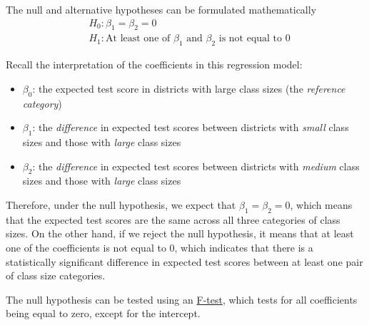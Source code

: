 \documentclass[
  12pt,
  a4paper,
]{scrbook}
\newenvironment{Shaded}{\begin{snugshade}}{\end{snugshade}}
\newcommand{\AttributeTok}[1]{\textcolor[rgb]{0.40,0.45,0.13}{#1}}
\newcommand{\DecValTok}[1]{\textcolor[rgb]{0.68,0.00,0.00}{#1}}
\newcommand{\FunctionTok}[1]{\textcolor[rgb]{0.28,0.35,0.67}{#1}}
\newcommand{\NormalTok}[1]{\textcolor[rgb]{0.00,0.23,0.31}{#1}}
\newcommand{\OtherTok}[1]{\textcolor[rgb]{0.00,0.23,0.31}{#1}}
\newcommand{\SpecialCharTok}[1]{\textcolor[rgb]{0.37,0.37,0.37}{#1}}
\newcommand{\StringTok}[1]{\textcolor[rgb]{0.13,0.47,0.30}{#1}}
\providecommand{\tightlist}{%
  \setlength{\itemsep}{0pt}\setlength{\parskip}{0pt}}
\renewcommand{\tightlist}{\setlength{\itemsep}{0.5\baselineskip}\setlength{\parskip}{0.2\baselineskip}}
\theoremstyle{plain}
\theoremstyle{definition}
\theoremstyle{remark}
\begin{document}
The null and alternative hypotheses can be formulated mathematically \[
\begin{split}
  &H_0: \beta_1 = \beta_2 = 0 \\
  &H_1: \text{At least one of $\beta_1$ and $\beta_2$ is not equal to 0}
\end{split}
\]

Recall the interpretation of the coefficients in this regression model:

\begin{itemize}
\tightlist
\item
  \(\beta_0\): the expected test score in districts with large class
  sizes (the \emph{reference category})
\item
  \(\beta_1\): the \emph{difference} in expected test scores between
  districts with \emph{small} class sizes and those with \emph{large}
  class sizes
\item
  \(\beta_2\): the \emph{difference} in expected test scores between
  districts with \emph{medium} class sizes and those with \emph{large}
  class sizes
\end{itemize}

Therefore, under the null hypothesis, we expect that
\(\beta_1 = \beta_2 = 0\), which means that the expected test scores are
the same across all three categories of class sizes. On the other hand,
if we reject the null hypothesis, it means that at least one of the
coefficients is not equal to 0, which indicates that there is a
statistically significant difference in expected test scores between at
least one pair of class size categories.

The null hypothesis can be tested using an \hyperref[f-test]{F-test},
which tests for all coefficients being equal to zero, except for the
intercept.

\begin{Shaded}
\end{Shaded}
\end{document}
